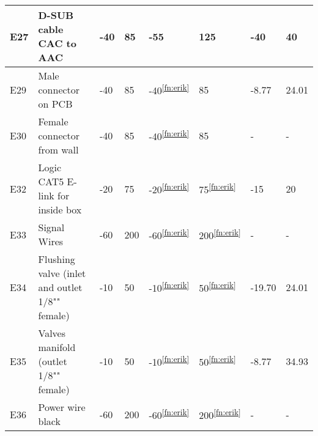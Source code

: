 \begin{longtable}{|m{1cm}|m{3.5cm}|m{1.3cm}|m{1.3cm}|m{1.4cm}|m{1.3cm}|m{1.3cm}|m{1.3cm}|}
E27 & D-SUB cable CAC to AAC & -40 & 85 & -55 & 125 & -40 & 40 \\ \hline
E29 & Male connector on PCB & -40 & 85 & -40\textsuperscript{\ref{fn:erik}} & 85 & -8.77 & 24.01 \\ \hline
E30 & Female connector from wall & -40 & 85 & -40\textsuperscript{\ref{fn:erik}} & 85 & - & - \\ \hline
E32 & Logic CAT5 E-link for inside box &-20 & 75 & -20\textsuperscript{\ref{fn:erik}} & 75\textsuperscript{\ref{fn:erik}} & -15 & 20 \\ \hline
E33 & Signal Wires & -60 & 200 & -60\textsuperscript{\ref{fn:erik}} & 200\textsuperscript{\ref{fn:erik}} & - & - \\ \hline
E34 & Flushing valve (inlet and outlet 1/8"" female) & -10 & 50 & -10\textsuperscript{\ref{fn:erik}} & 50\textsuperscript{\ref{fn:erik}} & -19.70 & 24.01 \\ \hline
E35 & Valves manifold (outlet 1/8"" female) & -10 & 50 & -10\textsuperscript{\ref{fn:erik}} & 50\textsuperscript{\ref{fn:erik}} & -8.77 & 34.93 \\ \hline
E36 & Power wire black & -60 & 200 & -60\textsuperscript{\ref{fn:erik}} & 200\textsuperscript{\ref{fn:erik}} & - & - \\ \hline

\end{longtable}
